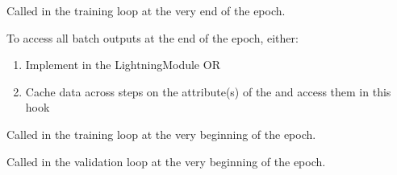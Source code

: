 \documentclass[letterpaper,10pt,english]{sphinxmanual}
\begin{document}
\begin{fulllineitems}
\begin{fulllineitems}
\label{\detokenize{pages/ml:vipercore.ml.plmodels.AEModel.on_train_epoch_end}}
\sphinxAtStartPar
Called in the training loop at the very end of the epoch.

\sphinxAtStartPar
To access all batch outputs at the end of the epoch, either:
\begin{enumerate}
%
\item {} 
\sphinxAtStartPar
Implement  in the LightningModule OR

\item {} 
\sphinxAtStartPar
Cache data across steps on the attribute(s) of the  and access them in this hook

\end{enumerate}

\end{fulllineitems}


\begin{fulllineitems}
\label{\detokenize{pages/ml:vipercore.ml.plmodels.AEModel.on_train_epoch_start}}
\sphinxAtStartPar
Called in the training loop at the very beginning of the epoch.

\end{fulllineitems}


\begin{fulllineitems}
\label{\detokenize{pages/ml:vipercore.ml.plmodels.AEModel.on_validation_epoch_start}}
\sphinxAtStartPar
Called in the validation loop at the very beginning of the epoch.

\end{fulllineitems}



\end{fulllineitems}
\end{document}
